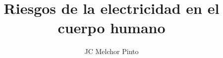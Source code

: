 \documentclass[12pt,addpoints,answers]{guia}
\title{Riesgos de la electricidad en el cuerpo humano}
\author{JC Melchor Pinto}
\begin{document}
\INFO%
\begin{questions}
    \questionboxed[25]{}
    \questionboxed[25]{}
\end{questions}
\end{document}
